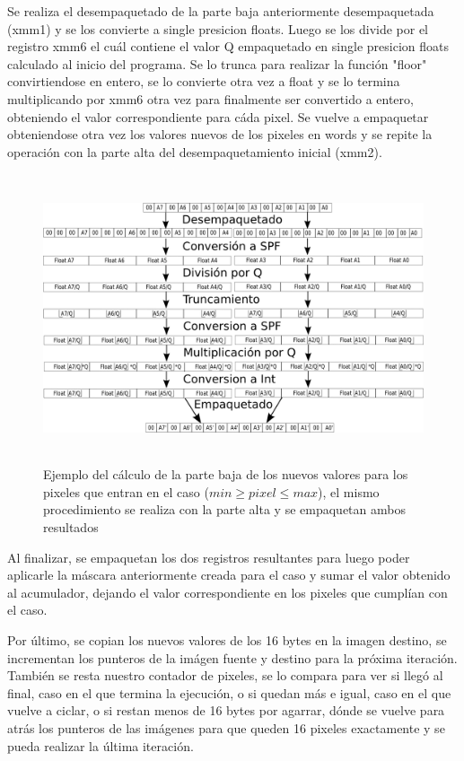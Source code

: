 Se realiza el desempaquetado de la parte baja anteriormente desempaquetada (xmm1) y se los convierte a single presicion floats. Luego se los divide por el registro xmm6 el cuál contiene el valor Q empaquetado en single presicion floats calculado al inicio del programa. Se lo trunca para realizar la función "floor" convirtiendose en entero, se lo convierte otra vez a float y se lo termina multiplicando por xmm6 otra vez para finalmente ser convertido a entero, obteniendo el valor correspondiente para cáda pixel. Se vuelve a empaquetar obteniendose otra vez los valores nuevos de los pixeles en words y se repite la operación con la parte alta del desempaquetamiento inicial (xmm2).

\begin{figure}[H]
\centering
\includegraphics[width=150mm, height=85mm]{calcq.png}
\caption{Ejemplo del cálculo de la parte baja de los nuevos valores para los pixeles que entran en el caso ($min \geq pixel \leq max$), el mismo procedimiento se realiza con la parte alta y se empaquetan ambos resultados}
\label{overflow}
\end{figure}

Al finalizar, se empaquetan los dos registros resultantes para luego poder aplicarle la máscara anteriormente creada para el caso y sumar el valor obtenido al acumulador, dejando el valor correspondiente en los pixeles que cumplían con el caso.

Por último, se copian los nuevos valores de los 16 bytes en la imagen destino, se incrementan los punteros de la imágen fuente y destino para la próxima iteración. También se resta nuestro contador de pixeles, se lo compara para ver si llegó al final, caso en el que termina la ejecución, o si quedan más e igual, caso en el que vuelve a ciclar, o si restan menos de 16 bytes por agarrar, dónde se vuelve para atrás los punteros de las imágenes para que queden 16 pixeles exactamente y se pueda realizar la última iteración.



